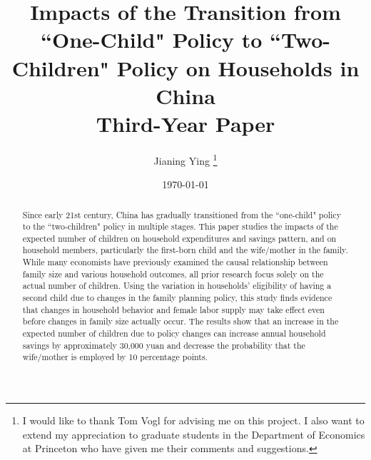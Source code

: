 \documentclass[12pt]{extarticle}
\begin{document}
\title{Impacts of the Transition from ``One-Child" Policy to ``Two-Children" Policy on Households in China \\  \large \vspace*{1\baselineskip} Third-Year Paper}
\author{Jianing Ying%
\thanks{I would like to thank Tom Vogl for advising me on this project. I also want to extend my appreciation to graduate students in the Department of Economics at Princeton who have given me their comments and suggestions.}}
\date{\today}

\maketitle

\begin{abstract}
Since early 21st century, China has gradually transitioned from the ``one-child" policy to the ``two-children" policy in multiple stages. This paper studies the impacts of the expected number of children on household expenditures and savings pattern, and on household members, particularly the first-born child and the wife/mother in the family. While many economists have previously examined the causal relationship between family size and various household outcomes, all prior research focus solely on the actual number of children. Using the variation in households' eligibility of having a second child due to changes in the family planning policy, this study finds evidence that changes in household behavior and female labor supply may take effect even before changes in family size actually occur. The results show that an increase in the expected number of children due to policy changes can increase annual household savings by approximately 30,000 yuan and decrease the probability that the wife/mother is employed by 10 percentage points.
\end{abstract}
\thispagestyle{empty}\baselineskip\newpage{}

\pagebreak
\setcounter{page}{1}
\end{document}
